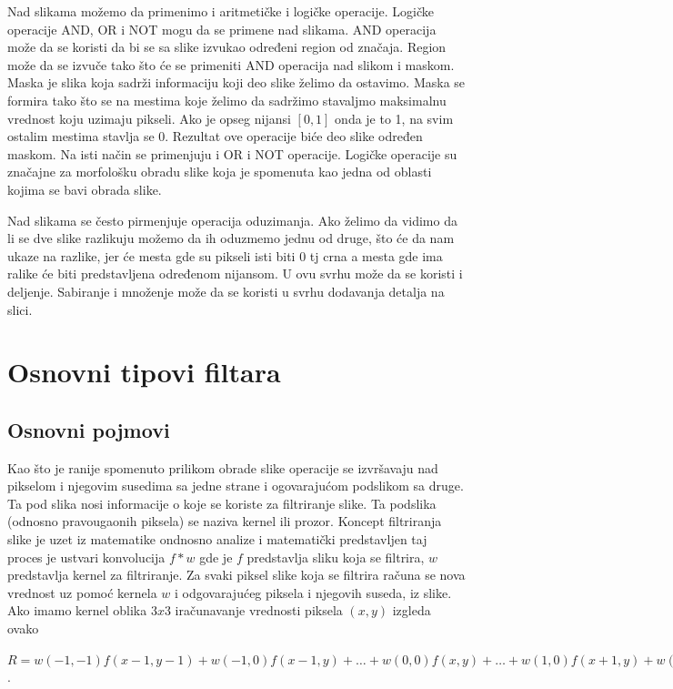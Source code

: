 \documentclass[a4paper,12pt,titlepage]{article}
\begin{document}
Nad slikama možemo da primenimo i aritmetičke i logičke operacije. Logičke operacije AND, OR i NOT mogu da se primene nad slikama. AND operacija može da se koristi da bi se sa slike izvukao određeni region od značaja. Region može da se izvuče tako što će se primeniti AND operacija nad slikom i maskom. Maska je slika koja sadrži informaciju koji deo slike želimo da ostavimo. Maska se formira tako što se na mestima koje želimo da sadržimo stavaljmo maksimalnu vrednost koju uzimaju pikseli. Ako je opseg nijansi $[0, 1]$ onda je to 1, na svim ostalim mestima stavlja se 0. Rezultat ove operacije biće deo slike određen maskom. Na isti način se primenjuju i OR i NOT operacije. Logičke operacije su značajne za morfološku obradu slike koja je spomenuta kao jedna od oblasti kojima se bavi obrada slike. 

Nad slikama se često pirmenjuje operacija oduzimanja. Ako želimo da vidimo da li se dve slike razlikuju možemo da ih oduzmemo jednu od druge, što će da nam ukaze na razlike, jer će mesta gde su pikseli isti biti 0 tj crna a mesta gde ima ralike će biti predstavljena određenom nijansom. U ovu svrhu može da se koristi i deljenje. Sabiranje i množenje može da se koristi u svrhu dodavanja detalja na slici. 

\section{Osnovni tipovi filtara}%

\subsection{Osnovni pojmovi}%

Kao što je ranije spomenuto prilikom obrade slike operacije se izvršavaju nad pikselom i njegovim susedima sa jedne strane i ogovarajućom podslikom sa druge. Ta pod slika nosi informacije o koje se koriste za filtriranje slike. Ta podslika (odnosno pravougaonih piksela) se naziva kernel ili prozor. Koncept filtriranja slike je uzet iz matematike ondnosno analize i matematički predstavljen taj proces je ustvari konvolucija $f * w$ gde je $f$ predstavlja sliku koja se filtrira, $w$ predstavlja kernel za filtriranje. Za svaki piksel slike koja se filtrira računa se nova vrednost uz pomoć kernela $w$ i odgovarajućeg piksela i njegovih suseda, iz slike. Ako imamo kernel oblika $3 x 3$ iračunavanje vrednosti piksela $(x, y)$ izgleda ovako

\begin{center}
$R = w(-1, -1)f(x - 1, y - 1) + w(-1, 0)f(x - 1, y) + \dots + w(0, 0)f(x, y) + \dots + w(1, 0)f(x + 1, y) + w(1, 1)f(x + 1, y + 1)$.
\end{center}
\end{document}
